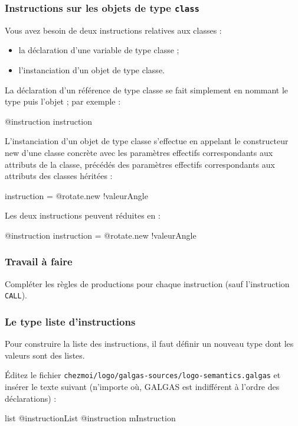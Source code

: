 \subsubsection{Instructions sur les objets de type \texttt{class}}

Vous avez besoin de deux instructions relatives aux classes :
\begin{itemize}
  \item la déclaration d'une variable de type classe ;
  \item l'instanciation d'un objet de type classe.
\end{itemize}

La déclaration d'un référence de type classe se fait simplement en nommant le type puis l'objet ; par exemple :
\begin{galgas}
@instruction instruction
\end{galgas}

L'instanciation d'un objet de type classe s'effectue en appelant le constructeur new d'une classe concrète avec les paramètres effectifs correspondants aux attributs de la classe, précédés des paramètres effectifs correspondants aux attributs des classes héritées :
\begin{galgas}
instruction = @rotate.new {!valeurAngle}
\end{galgas}

Les deux instructions peuvent réduites en :
\begin{galgas}
@instruction instruction = @rotate.new {!valeurAngle}
\end{galgas}

\subsubsection{Travail à faire}
Compléter les règles de productions pour chaque instruction (sauf l'instruction \texttt{CALL}).

\subsubsection{Le type liste d'instructions}
Pour construire la liste des instructions, il faut définir un nouveau type dont les valeurs sont des listes.

Éditez le fichier \texttt{chezmoi/logo/galgas-sources/logo-semantics.galgas} et insérer le texte suivant (n’importe où, GALGAS est indifférent à l’ordre des déclarations) :

\begin{galgas}
list @instructionList {
  @instruction mInstruction
}
\end{galgas}

